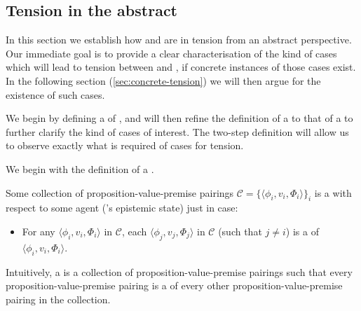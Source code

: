 \subsection{Tension in the abstract}
\label{sec:tension-abstract}

\begin{note}[Plan]
  In this section we establish how \csN{} and \ESU{} are in tension from an abstract perspective.
  Our immediate goal is to provide a clear characterisation of the kind of cases which will lead to tension between \csN{} and \ESU{}, if concrete instances of those cases exist.
  In the following section (\ref{sec:concrete-tension}) we will then argue for the existence of such cases.

  We begin by defining a  of , and will then refine the definition of a  to that of a \ragCluster{} to further clarify the kind of cases of interest.
  The two-step definition will allow us to observe exactly what is required of cases for tension.
\end{note}

\begin{note}[\requCluster{3}]
  We begin with the definition of a \cluster{}.
  \begin{definition}[A \requCluster{1}]
    \label{def:requCluster}
    Some collection of proposition-value-premise pairings \(\mathcal{C} = \{\langle \phi_{i}, v_{i}, \Phi_{i} \rangle\}_{i}\) is a \emph{\cluster{}} with respect to some agent \vAgent{}('s epistemic state) just in case:
    \begin{itemize}
    \item
      For any \(\langle \phi_{i}, v_{i}, \Phi_{i} \rangle\) in \(\mathcal{C}\), each \(\langle \phi_{j}, v_{j}, \Phi_{j} \rangle\) in \(\mathcal{C}\) (such that \(j \ne i\)) is a \requ{} of \(\langle \phi_{i}, v_{i}, \Phi_{i} \rangle\).
    \end{itemize}
    \vspace{-\baselineskip}
  \end{definition}

  Intuitively, a  is a collection of proposition-value-premise pairings such that every proposition-value-premise pairing is a \requ{} of every other proposition-value-premise pairing in the collection.
\end{note}

